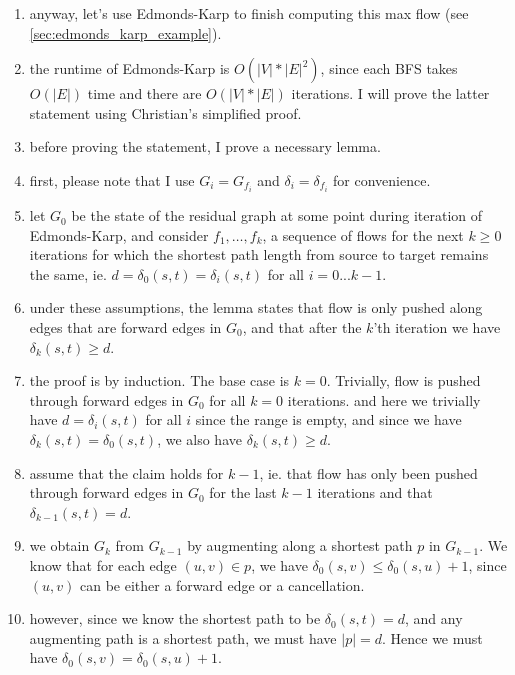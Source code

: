 \begin{enumerate}
  \item anyway, let's use Edmonds-Karp to finish computing this max flow (see
    \cref{sec:edmonds_karp_example}).

  \item the runtime of Edmonds-Karp is $O(|V| * |E|^2)$, since each BFS takes
    $O(|E|)$ time and there are $O(|V| * |E|)$ iterations. I will prove the
    latter statement using Christian's simplified proof.

  \item before proving the statement, I prove a necessary lemma.

  \item first, please note that I use $G_i = G_{f_i}$ and $\delta_i =
    \delta_{f_i}$ for convenience.

  \item let $G_0$ be the state of the residual graph at some point during
    iteration of Edmonds-Karp, and consider $f_1, \dots, f_k$, a sequence of
    flows for the next $k \geq 0$ iterations for which the shortest path length
    from source to target remains the same, ie. $d = \delta_0(s, t) =
    \delta_i(s, t)$ for all $i = 0 ... k - 1$.

  \item under these assumptions, the lemma states that flow is only pushed along
    edges that are forward edges in $G_0$, and that after the $k$'th iteration
    we have $\delta_k(s, t) \geq d$.

  \item the proof is by induction. The base case is $k = 0$. Trivially, flow is
    pushed through forward edges in $G_0$ for all $k = 0$ iterations. and here
    we trivially have $d = \delta_i(s, t)$ for all $i$ since the range is empty,
    and since we have $\delta_k(s, t) = \delta_0(s, t)$, we also have
    $\delta_k(s, t) \geq d$.

  \item assume that the claim holds for $k - 1$, ie. that flow has only been
    pushed through forward edges in $G_0$ for the last $k - 1$ iterations and
    that $\delta_{k - 1}(s, t) = d$.

  \item we obtain $G_k$ from $G_{k - 1}$ by augmenting along a shortest path $p$
    in $G_{k - 1}$. We know that for each edge $(u, v) \in p$, we have
    $\delta_0(s, v) \leq \delta_0(s, u) + 1$, since $(u, v)$ can be either a
    forward edge or a cancellation.\label{item:foo}

  \item however, since we know the shortest path to be $\delta_0(s, t) = d$, and
    any augmenting path is a shortest path, we must have $|p| = d$. Hence we
    must have $\delta_0(s, v) = \delta_0(s, u) + 1$.


\end{enumerate}
